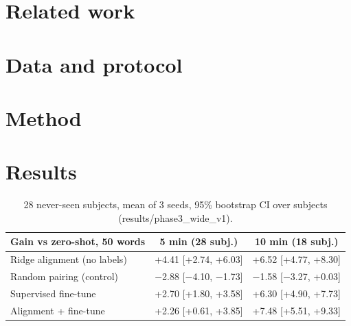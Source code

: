 \documentclass[11pt]{article}
\begin{document}
\section{Related work}

\section{Data and protocol}

\section{Method}

\section{Results}
\begin{table}[h]\centering
\begin{tabular}{lcc}\toprule
Gain vs zero-shot, 50 words & 5 min (28 subj.) & 10 min (18 subj.)\\\midrule
Ridge alignment (no labels) & +4.41 [+2.74, +6.03] & +6.52 [+4.77, +8.30]\\
Random pairing (control) & $-$2.88 [$-$4.10, $-$1.73] & $-$1.58 [$-$3.27, +0.03]\\
Supervised fine-tune & +2.70 [+1.80, +3.58] & +6.30 [+4.90, +7.73]\\
Alignment + fine-tune & +2.26 [+0.61, +3.85] & +7.48 [+5.51, +9.33]\\\bottomrule
\end{tabular}
\caption{28 never-seen subjects, mean of 3 seeds, 95\% bootstrap CI over subjects (results/phase3\_wide\_v1).}
\end{table}
\end{document}
